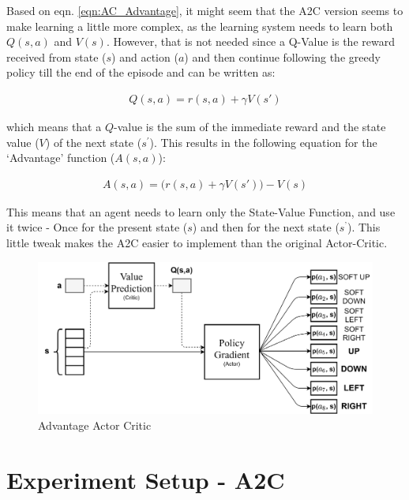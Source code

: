 Based on eqn. \ref{eqn:AC_Advantage}, it might seem that the A2C version seems to make learning a little more complex, as the learning system needs to learn both $Q(s,a)$ and $V(s)$. However, that is not needed since a Q-Value is the reward received from state ($s$) and action ($a$) and then continue following the greedy policy till the end of the episode and can be written as:

\begin{align}
    Q(s,a) = r(s,a) + \gamma V(s')
\end{align}

which means that a $Q$-value is the sum of the immediate reward and the state value ($V$) of the next state ($s^'$). This results in the following equation for the `Advantage' function ($A(s,a)$):

\begin{align}
    A(s,a) = \Big( r(s,a) + \gamma V(s') \Big) - V(s)
\end{align}

This means that an agent needs to learn only the State-Value Function, and use it twice - Once for the present state ($s$) and then for the next state ($s^’$). This little tweak makes the A2C easier to implement than the original Actor-Critic.

\begin{figure}[h!]
    \centering
    \includegraphics[width=\textwidth]{Figures/Ch_RL/AC.png}
    \caption{Advantage Actor Critic}
    \label{fig:RL_A2C}
\end{figure}

\section{Experiment Setup - A2C}

